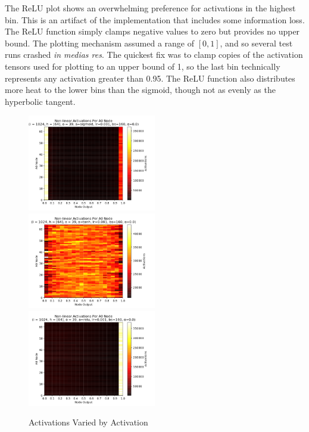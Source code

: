 \documentclass[10pt,epsf]{article}
\begin{document}
{{{      The ReLU plot shows an overwhelming preference for activations in the highest bin. This is
      an artifact of the implementation that includes some information loss. The ReLU function
      simply clamps negative values to zero but provides no upper bound. The plotting mechanism
      assumed a range of $[0,1]$, and so several test runs crashed \emph{in medias res}. The quickest
      fix was to clamp copies of the activation tensors used for plotting to an upper bound of 1,
      so the last bin technically represents any activation greater than 0.95. The ReLU function
      also distributes more heat to the lower bins than the sigmoid, though not as evenly as the
      hyperbolic tangent.
    }
    \begin{figure}[H]
      \includegraphics[width=0.5\textwidth]{./img/64-0.001-160-0-sigmoid-1/activations-A0-255.png}
      \includegraphics[width=0.5\textwidth]{./img/64-0.001-160-0-tanh-1/activations-A0-255.png}
      \includegraphics[width=0.5\textwidth]{./img/64-0.001-160-0-relu-1/activations-A0-255.png}
      \caption{Activations Varied by Activation}
      \label{fig:a-by-u}
    \end{figure}
  }
}
\end{document}

